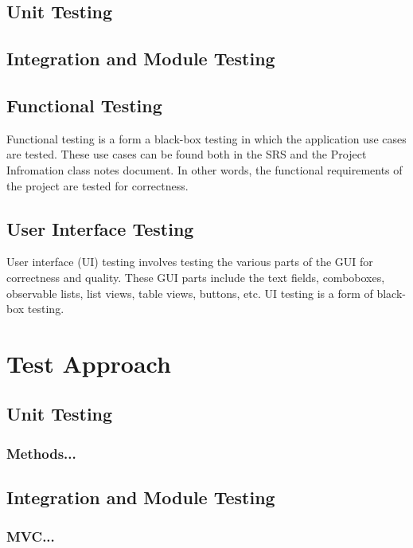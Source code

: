\documentclass[table]{scrreprt}
\begin{document}
    \section{Unit Testing}

    \section{Integration and Module Testing}

    \section{Functional Testing}
    Functional testing is a form a black-box testing in which the application use cases are tested. These use cases can be found both in the SRS and the Project Infromation class notes document. In other words, the functional requirements of the project are tested for correctness.

    \section{User Interface Testing}
    User interface (UI) testing involves testing the various parts of the GUI for correctness and quality. These GUI parts include the text fields, comboboxes, observable lists, list views, table views, buttons, etc. UI testing is a form of black-box testing.

    \chapter{Test Approach}

    \section{Unit Testing}

    \subsection{Methods...}

    \section{Integration and Module Testing}

    \subsection{MVC...}
\end{document}
